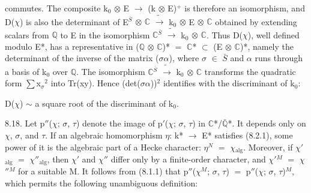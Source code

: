 \documentclass[10pt,twoside]{article}
\begin{document}
commutes. The composite k\ensuremath{_{0}} \ensuremath{⊗} E \ensuremath{→} (k \ensuremath{⊗} E)\ensuremath{^{+}} is therefore an isomorphism, and D(\ensuremath{χ}) is also the determinant of E\ensuremath{^{\bar{S}}} \ensuremath{⊗} \ensuremath{ℂ} \ensuremath{\widetilde{→}} k\ensuremath{_{0}} \ensuremath{⊗} E \ensuremath{⊗} \ensuremath{ℂ} obtained by extending scalars from \ensuremath{ℚ} to E in the isomorphism \ensuremath{ℂ}\ensuremath{^{\bar{S}}} \ensuremath{\widetilde{→}} k\ensuremath{_{0}} \ensuremath{⊗} \ensuremath{ℂ}. Thus D(\ensuremath{χ}), well defined modulo E*, has a representative in (\ensuremath{ℚ} \ensuremath{⊗} \ensuremath{ℂ})* \ensuremath{=} \ensuremath{ℂ}* \ensuremath{⊂} (E \ensuremath{⊗} \ensuremath{ℂ})*, namely the determinant of the inverse of the matrix (\ensuremath{σ}\ensuremath{α}), where \ensuremath{σ} \ensuremath{∈} \ensuremath{\bar{S}} and \ensuremath{α} runs through a basis of k\ensuremath{_{0}} over \ensuremath{ℚ}. The isomorphism \ensuremath{ℂ}\ensuremath{^{\bar{S}}} \ensuremath{\widetilde{→}} k\ensuremath{_{0}} \ensuremath{⊗} \ensuremath{ℂ} transforms the quadratic form \ensuremath{∑}x\ensuremath{_{σ}}\ensuremath{^{2}} into Tr(xy). Hence (det(\ensuremath{σ}\ensuremath{α}))\ensuremath{^{2}} identifies with the discriminant of k\ensuremath{_{0}}:\par
D(\ensuremath{χ}) \ensuremath{∼} a square root of the discriminant of k\ensuremath{_{0}}.\par
8.18. Let p\ensuremath{″}(\ensuremath{χ}; \ensuremath{σ}, \ensuremath{τ}) denote the image of p\ensuremath{′}(\ensuremath{χ}; \ensuremath{σ}, \ensuremath{τ}) in \ensuremath{ℂ}*/\ensuremath{\bar{ℚ}}*. It depends only on \ensuremath{χ}, \ensuremath{σ}, and \ensuremath{τ}. If an algebraic homomorphism \ensuremath{η}: k* \ensuremath{→} E* satisfies (8.2.1), some power of it is the algebraic part of a Hecke character: \ensuremath{η}\ensuremath{^{N}} \ensuremath{=} \ensuremath{χ}\ensuremath{_{\mathrm{alg}}}. Moreover, if \ensuremath{χ}\ensuremath{′}\ensuremath{_{\mathrm{alg}}} \ensuremath{=} \ensuremath{χ}\ensuremath{″}\ensuremath{_{\mathrm{alg}}}, then \ensuremath{χ}\ensuremath{′} and \ensuremath{χ}\ensuremath{″} differ only by a finite-order character, and \ensuremath{χ}\ensuremath{′}\ensuremath{^{M}} \ensuremath{=} \ensuremath{χ}\ensuremath{″}\ensuremath{^{M}} for a suitable M. It follows from (8.1.1) that p\ensuremath{″}(\ensuremath{χ}\ensuremath{^{M}}; \ensuremath{σ}, \ensuremath{τ}) \ensuremath{=} p\ensuremath{″}(\ensuremath{χ}; \ensuremath{σ}, \ensuremath{τ})\ensuremath{^{M}}, which permits the following unambiguous definition:\par
\end{document}

